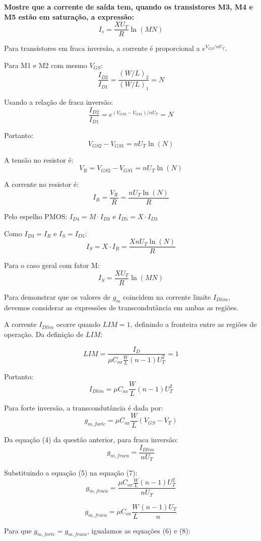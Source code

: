 ﻿\documentclass[12pt,a4paper]{article}
\begin{document}
\textbf{Mostre que a corrente de saída tem, quando os transistores M3, M4 e M5 estão em saturação, a expressão:}
$$I_s = \frac{XU_T}{R} \ln(MN)$$



Para transistores em fraca inversão, a corrente é proporcional a $e^{V_{GS}/nU_T}$. 

Para M1 e M2 com mesmo $V_{GS}$:
$$\frac{I_{D2}}{I_{D1}} = \frac{(W/L)_2}{(W/L)_1} = N$$

Usando a relação de fraca inversão:
$$\frac{I_{D2}}{I_{D1}} = e^{(V_{GS2} - V_{GS1})/nU_T} = N$$

Portanto:
$$V_{GS2} - V_{GS1} = nU_T \ln(N)$$

A tensão no resistor é:
$$V_R = V_{GS2} - V_{GS1} = nU_T \ln(N)$$

A corrente no resistor é:
$$I_R = \frac{V_R}{R} = \frac{nU_T \ln(N)}{R}$$

Pelo espelho PMOS: $I_{D4} = M \cdot I_{D3}$ e $I_{D5} = X \cdot I_{D3}$

Como $I_{D3} = I_R$ e $I_S = I_{D5}$:
$$I_S = X \cdot I_R = \frac{XnU_T \ln(N)}{R}$$

Para o caso geral com fator M:
$$\boxed{I_S = \frac{XU_T}{R} \ln(MN)}$$

Para demonstrar que os valores de $g_m$ coincidem na corrente limite $I_{Dlim}$, devemos considerar as expressões de transcondutância em ambas as regiões.



A corrente $I_{Dlim}$ ocorre quando $LIM = 1$, definindo a fronteira entre as regiões de operação. Da definição de $LIM$:

$$LIM = \frac{I_D}{\mu C_{ox} \frac{W}{L} (n-1) U_T^2} = 1$$

Portanto:
$$I_{Dlim} = \mu C_{ox} \frac{W}{L} (n-1) U_T^2 $$



Para forte inversão, a transcondutância é dada por:
$$g_{m,forte} = \mu C_{ox} \frac{W}{L} (V_{GS} - V_T) $$



Da equação (4) da questão anterior, para fraca inversão:
$$g_{m,fraca} = \frac{I_{Dlim}}{nU_T} $$

Substituindo a equação (5) na equação (7):
$$g_{m,fraca} = \frac{\mu C_{ox} \frac{W}{L} (n-1) U_T^2}{nU_T}$$

$$g_{m,fraca} = \mu C_{ox} \frac{W}{L} \frac{(n-1)U_T}{n} $$



Para que $g_{m,forte} = g_{m,fraca}$, igualamos as equações (6) e (8):
\end{document}
